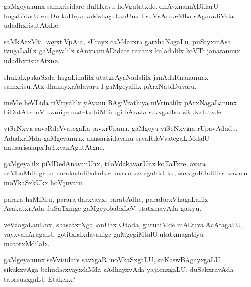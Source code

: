 \documentclass{article}
\begin{document}
\begin{mng}%
gaMgeyanunx samxrisidare duHKavu hoVgutatxde. dhAyxnamADidarU hogaLidarU eraDu kaDeya vaMshagaLanUnx I saMsAraveMba sAgaradiMda udadhxrisutAtxLe.
\end{mng}

\begin{mng}%
saMkArxMti, vayxtiVpAta, sUrayx caMdarxra garxhaNagaLu, puSayxmAsa ivugaLalilx gaMgeyalilx sAnxnamADidare tananx kuladalilx koVTi janaranunx udadhxrisutAtxne.
\end{mng}

\begin{mng}%
shukalxpakaSxda hagaLinalilx utatxrAyaNadalilx janAdaRnananunx samxrisutAtx dhanayxrAdavaru I gaMgeyalilx pArxNabiDuvaru.
\end{mng}

\begin{mng}%
meVle heVLida riVtiyalilx yAvanu BAgiVrathiya niVrinalilx pArxNagaLanunx biDutAtxnoV avanige matetx hiMtirugi bArada savxgaRvu sikukxtatxde.
\end{mng}

\begin{mng}%
viSuNxvu savaRdeVvategaLa savxrUpanu. gaMgeyu viSuNxvina rUpavAdudu. AdadxriMda gaMgeyanunx anusarisidavanu savaRdeVvategaLiMdalU anusarisalapxTaTxvanAgutAtxne.
\end{mng}

\begin{mng}%
gaMgeyalilx piMDedAnavanUnx, tiloVdakavanUnx koTaTxre, avara saMbaMdhigaLu narakadalilxdadxre avaru savxgaRkUkx, savxgaRdalilixruvavaru moVkaSxkUkx hoVguvaru.
\end{mng}

\begin{mng}%
parara haMDiru, parara darxvayx, parabAdhe, paradorxVhagaLalilx AsakatxnAda duSaTxnige gaMgeyobabxLeV utatxmavAda gatiyu.
\end{mng}

\begin{mng}%
veVdagaLanUnx, shasatxrXgaLanUnx Odada, guruniMde mADuva AcAragaLU, vayxvahAragaLU gotitxlalxdavanige gaMgegiMtalU utatxmagatiyu matotxMdilalx.
\end{mng}

\begin{mng}%
gaMgeyanunx seVvisidare savxgaR moVkaSxgaLU, suKaswBAgayxgaLU sikukxvAga bahudarxvayxdiMda sAdhayxvAda yajacnxgaLU, duSakxravAda tapasusxgaLU Etakekx?
\end{mng}
\end{document}

